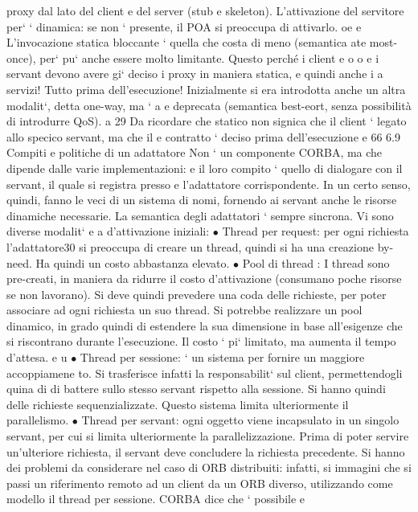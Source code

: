 \documentclass[a4paper,12pt]{article}
\begin{document}
proxy dal lato del client e del server (stub e skeleton). L'attivazione del servitore
per` ` dinamica: se non ` presente, il POA si preoccupa di attivarlo.
oe
e
L'invocazione statica bloccante ` quella che costa di meno (semantica ate
most-once), per` pu` anche essere molto limitante. Questo perché i client e
o
o
e
i servant devono avere gi` deciso i proxy in maniera statica, e quindi anche i
a
servizi! Tutto prima dell'esecuzione!
Inizialmente si era introdotta anche un altra modalit`, detta one-way, ma `
a
e
deprecata (semantica best-eort, senza possibilità di introdurre QoS).
a
29 Da ricordare che statico non signica che il client ` legato allo specico servant, ma che il
e
contratto ` deciso prima dell'esecuzione
e
66
6.9
Compiti e politiche di un adattatore
Non ` un componente CORBA, ma che dipende dalle varie implementazioni:
e
il loro compito ` quello di dialogare con il servant, il quale si registra presso
e
l'adattatore corrispondente. In un certo senso, quindi, fanno le veci di un sistema
di nomi, fornendo ai servant anche le risorse dinamiche necessarie.
La semantica degli adattatori ` sempre sincrona. Vi sono diverse modalit`
e
a
d'attivazione iniziali:
$\bullet$ Thread per request: per ogni richiesta l'adattatore30 si preoccupa di creare
un thread, quindi si ha una creazione by-need. Ha quindi un costo abbastanza elevato.
$\bullet$ Pool di thread : I thread sono pre-creati, in maniera da ridurre il costo
d'attivazione (consumano poche risorse se non lavorano). Si deve quindi
prevedere una coda delle richieste, per poter associare ad ogni richiesta un
suo thread.
Si potrebbe realizzare un pool dinamico, in grado quindi di estendere la
sua dimensione in base all'esigenze che si riscontrano durante l'esecuzione.
Il costo ` pi` limitato, ma aumenta il tempo d'attesa.
e u
$\bullet$ Thread per sessione: ` un sistema per fornire un maggiore accoppiamene
to. Si trasferisce infatti la responsabilit` sul client, permettendogli quina
di di battere sullo stesso servant rispetto alla sessione. Si hanno quindi delle richieste sequenzializzate. Questo
sistema limita ulteriormente il
parallelismo.
$\bullet$ Thread per servant: ogni oggetto viene incapsulato in un singolo servant,
per cui si limita ulteriormente la parallelizzazione. Prima di poter servire
un'ulteriore richiesta, il servant deve concludere la richiesta precedente.
Si hanno dei problemi da considerare nel caso di ORB distribuiti: infatti, si
immagini che si passi un riferimento remoto ad un client da un ORB diverso,
utilizzando come modello il thread per sessione. CORBA dice che ` possibile
e
\end{document}
